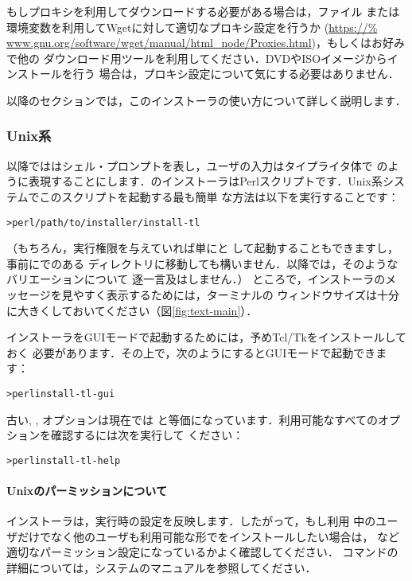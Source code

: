 \documentclass[uplatex,dvipdfmx,tombow]{jsarticle}
\begin{document}
もしプロキシを利用してダウンロードする必要がある場合は，ファイル
または環境変数を利用してWgetに対して適切なプロキシ設定を行うか (\url{https://%
www.gnu.org/software/wget/manual/html_node/Proxies.html})，もしくはお好みで他の
ダウンロード用ツールを利用してください．DVDやISOイメージからインストールを行う
場合は，プロキシ設定について気にする必要はありません．

以降のセクションでは，このインストーラの使い方について詳しく説明します．

\subsubsection{Unix系}

以降では\code{>}はシェル・プロンプトを表し，ユーザの入力はタイプライタ体で
のように表現することにします．\TL のインストーラはPerlスクリプトです．Unix系システムでこのスクリプトを起動する最も簡単
な方法は以下を実行することです：
%
\begin{alltt}
> perl /path/to/installer/install-tl
\end{alltt}
%
（もちろん，実行権限を与えていれば単にと
して起動することもできますし，事前にでのある
ディレクトリに移動しても構いません．以降では，そのようなバリエーションについて
逐一言及はしません．）
%
ところで，インストーラのメッセージを見やすく表示するためには，ターミナルの
ウィンドウサイズは十分に大きくしておいてください（図\ref{fig:text-main}）．

インストーラをGUIモードで起動するためには，予めTcl/Tkをインストールしておく
必要があります．その上で，次のようにするとGUIモードで起動できます：
%
\begin{alltt}
> perl install-tl -gui
\end{alltt}

古い, , オプションは現在では%
と等価になっています．利用可能なすべてのオプションを確認するには次を実行して
ください：
%
\begin{alltt}
> perl install-tl -help
\end{alltt}

\paragraph{Unixのパーミッションについて}
\TL インストーラは，実行時の設定を反映します．したがって，もし利用
中のユーザだけでなく他のユーザも利用可能な形で\TL をインストールしたい場合は，
など適切なパーミッション設定になっているかよく確認してください．
コマンドの詳細については，システムのマニュアルを参照してください．
\end{document}
